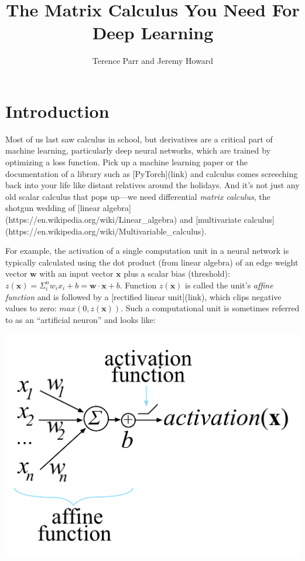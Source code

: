 \documentclass[11pt]{article}
\title{The Matrix Calculus You Need For Deep Learning}
\author{Terence Parr and Jeremy Howard}
\begin{document}
\maketitle

\section{Introduction}

Most of us last saw calculus in school, but derivatives are a critical part of machine learning, particularly deep neural networks, which are trained by optimizing a loss function. Pick up a machine learning paper or the documentation of a library such as [PyTorch](link) and calculus comes screeching back into your life like distant relatives around the holidays.  And it's not just any old scalar calculus that pops up---we need differential {\em matrix calculus}, the shotgun wedding of [linear algebra](https://en.wikipedia.org/wiki/Linear\_algebra) and [multivariate calculus](https://en.wikipedia.org/wiki/Multivariable\_calculus).

For example, the activation of a single computation unit in a neural network is typically calculated using the dot product (from linear algebra) of an edge weight vector $\mathbf{w}$ with an input vector $\mathbf{x}$ plus a scalar bias (threshold): $z(\mathbf{x}) = \Sigma_i^n w_i x_i + b = \mathbf{w} \cdot \mathbf{x} + b$. Function $z(\mathbf{x})$ is called the unit's {\em affine function} and is followed by a [rectified linear unit](link), which clips negative values to zero: $max(0, z(\mathbf{x}))$. Such a computational unit is sometimes referred to as an ``artificial neuron'' and looks like:

\begin{center}
	\includegraphics[scale=.9]{neuron.png}
\end{center}
\end{document}
